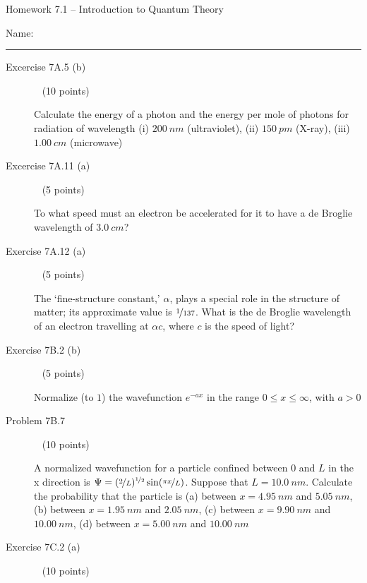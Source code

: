 \documentclass[10pt, letterpaper]{memoir}
\begin{document}
\begin{center}
	{\large Homework 7.1 -- Introduction to Quantum Theory}
\end{center}

Name: \rule[-.1mm]{15em}{0.1pt}

\begin{description}
	\item [Excercise 7A.5 (b)] ~ (10 points)

	      Calculate the energy of a photon and the energy per mole of photons for radiation of wavelength (i) $200~nm$ (ultraviolet), (ii) $150~pm$ (X-ray), (iii) $1.00~cm$ (microwave)

	      \vspace{10em}
	\item [Excercise 7A.11 (a)] ~ (5 points)

	      To what speed must an electron be accelerated for it to have a de Broglie wavelength of $3.0~cm$?

	      \vspace{8em}
	\item [Exercise 7A.12 (a)] ~ (5 points)

	      The `fine-structure constant,' $\alpha$, plays a special role in the structure of matter; its approximate value is $\nicefrac{1}{137}$. What is the de Broglie wavelength of an electron travelling at $\alpha c$, where $c$ is the speed of light?

	      \vspace{10em}
	\item [Exercise 7B.2 (b)] ~ (5 points)

	      Normalize (to $1$) the wavefunction $e^{-ax}$ in the range $0\leq x\leq\infty$, with $a>0$

	      \vspace{15em}
	\item [Problem 7B.7] ~ (10 points)

	      A normalized wavefunction for a particle confined between $0$ and $L$ in the x direction is $\Psi=(\nicefrac{2}{L})^{\nicefrac{1}{2}}\sin(\nicefrac{\pi x}{L})$. Suppose that $L = 10.0~nm$. Calculate the probability that the particle is (a) between $x=4.95~nm$ and $5.05~nm$, (b) between $x=1.95~nm$ and $2.05~nm$, (c) between $x=9.90~nm$ and $10.00~nm$, (d) between $x=5.00~nm$ and $10.00~nm$

	      \vspace{15em}
	\item [Exercise 7C.2 (a)] ~ (10 points)


\end{description}
\end{document}
